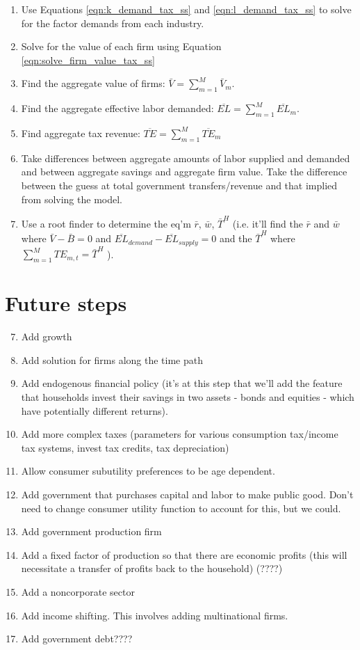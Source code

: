\documentclass[letterpaper,12pt]{article}
\theoremstyle{definition}
\begin{document}
\begin{spacing}{1.5}
\begin{enumerate}
\item Use Equations \ref{eqn:k_demand_tax_ss} and \ref{eqn:l_demand_tax_ss} to solve for the factor demands from each industry.
\item Solve for the value of each firm using Equation \ref{eqn:solve_firm_value_tax_ss}
\item Find the aggregate value of firms: $\bar{V} = \sum_{m=1}^{M}\bar{V}_{m}$.
\item Find the aggregate effective labor demanded: $\overline{EL} =\sum_{m=1}^{M} \overline{EL}_{m}$.
\item Find aggregate tax revenue: $\overline{TE}= \sum_{m=1}^{M}\overline{TE}_{m}$
\item Take differences between aggregate amounts of labor supplied and demanded and between aggregate savings and aggregate firm value.  Take the difference between the guess at total government transfers/revenue and that implied from solving the model.
\item Use a root finder to determine the eq'm $\bar{r}$, $\bar{w}$, $\bar{T}^{H}$ (i.e. it'll find the $\bar{r}$ and $\bar{w}$ where $\bar{V}-\bar{B}=0$ and $\overline{EL}_{demand}-\overline{EL}_{supply}=0$ and the $\bar{T}^{H}$ where $\sum_{m=1}^{M}TE_{m,t}=\bar{T}^{H}$ ).
\end{enumerate}



\section*{Future steps}

\begin{enumerate}
\setcounter{enumi}{6}
\item Add growth
\item Add solution for firms along the time path
\item Add endogenous financial policy (it's at this step that we'll add the feature that households invest their savings in two assets - bonds and equities - which have potentially different returns).
\item Add more complex taxes (parameters for various consumption tax/income tax systems, invest tax credits, tax depreciation)
\item Allow consumer subutility preferences to be age dependent.
\item Add government that purchases capital and labor to make public good.  Don't need to change consumer utility function to account for this, but we could.
\item Add government production firm
\item Add a fixed factor of production so that there are economic profits (this will necessitate a transfer of profits back to the household) (????)
\item Add a noncorporate sector
\item Add income shifting.  This involves adding multinational firms.
\item Add government debt????
\end{enumerate}


\end{spacing}

\clearpage

%  
\end{document}
